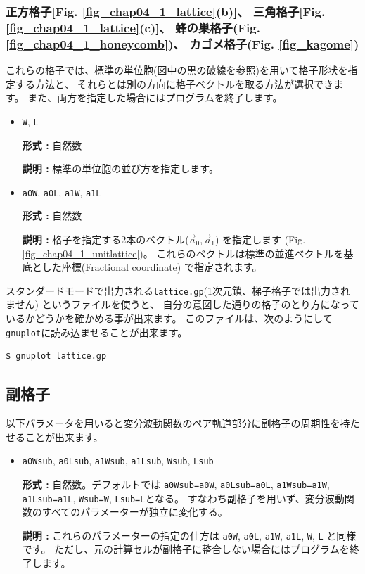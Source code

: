 \subsubsection{正方格子[Fig. \ref{fig_chap04_1_lattice}(b)]、 
三角格子[Fig. \ref{fig_chap04_1_lattice}(c)]、
蜂の巣格子(Fig. \ref{fig_chap04_1_honeycomb})、
カゴメ格子(Fig. \ref{fig_kagome})}

これらの格子では、標準の単位胞(図中の黒の破線を参照)を用いて格子形状を指定する方法と、
それらとは別の方向に格子ベクトルを取る方法が選択できます。
また、両方を指定した場合にはプログラムを終了します。

\begin{itemize}

\item \verb|W|, \verb|L|

{\bf 形式 :} 自然数

{\bf 説明 :} 標準の単位胞の並び方を指定します。

\item \verb|a0W|, \verb|a0L|, \verb|a1W|, \verb|a1L|

{\bf 形式 :} 自然数

{\bf 説明 :} 格子を指定する2本のベクトル(${\vec a}_0, {\vec a}_1$)
を指定します (Fig. \ref{fig_chap04_1_unitlattice})。
これらのベクトルは標準の並進ベクトルを基底とした座標(Fractional coordinate)
で指定されます。

\end{itemize}

スタンダードモードで出力される\verb|lattice.gp|(1次元鎖、梯子格子では出力されません)
というファイルを使うと、
自分の意図した通りの格子のとり方になっているかどうかを確かめる事が出来ます。
このファイルは、次のようにして\verb|gnuplot|に読み込ませることが出来ます。
\begin{verbatim}
$ gnuplot lattice.gp
\end{verbatim}

\subsection{副格子}

以下パラメータを用いると変分波動関数のペア軌道部分に副格子の周期性を持たせることが出来ます。

\begin{itemize}

\item \verb|a0Wsub|, \verb|a0Lsub|, \verb|a1Wsub|, \verb|a1Lsub|, \verb|Wsub|, \verb|Lsub|

{\bf 形式 :} 自然数。デフォルトでは
\verb|a0Wsub=a0W|, \verb|a0Lsub=a0L|, \verb|a1Wsub=a1W|, \verb|a1Lsub=a1L|, 
\verb|Wsub=W|, \verb|Lsub=L|となる。
すなわち副格子を用いず、変分波動関数のすべてのパラメーターが独立に変化する。

{\bf 説明 :} これらのパラメーターの指定の仕方は
\verb|a0W|, \verb|a0L|, \verb|a1W|, \verb|a1L|, \verb|W|, \verb|L|
と同様です。
ただし、元の計算セルが副格子に整合しない場合にはプログラムを終了します。

\end{itemize}

